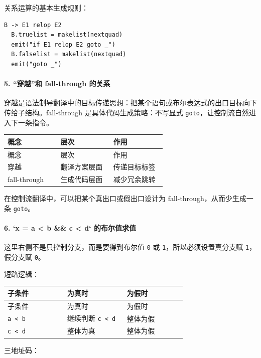 \documentclass[UTF8]{ctexart}
\begin{document}
关系运算的基本生成规则：

\begin{Verbatim}[fontsize=\small,breaklines=true]
B -> E1 relop E2
  B.truelist = makelist(nextquad)
  emit("if E1 relop E2 goto _")
  B.falselist = makelist(nextquad)
  emit("goto _")
\end{Verbatim}

\paragraph*{5. “穿越”和 fall-through 的关系}

穿越是语法制导翻译中的目标传递思想：把某个语句或布尔表达式的出口目标向下传给子结构。fall-through 是具体代码生成策略：不写显式 \texttt{goto}，让控制流自然进入下一条指令。

\begin{longtable}{|p{0.31\linewidth}|p{0.31\linewidth}|p{0.31\linewidth}|}
\hline
概念 & 层次 & 作用 \\
\hline
\endfirsthead
概念 & 层次 & 作用 \\
\hline
\endhead
穿越 & 翻译方案层面 & 传递目标标签 \\
\hline
fall-through & 生成代码层面 & 减少冗余跳转 \\
\hline
\end{longtable}

在控制流翻译中，可以把某个真出口或假出口设计为 fall-through，从而少生成一条 \texttt{goto}。

\paragraph*{6. `x = a < b \&\& c < d` 的布尔值求值}

这里右侧不是只控制分支，而是要得到布尔值 \texttt{0} 或 \texttt{1}，所以必须设置真分支赋 \texttt{1}，假分支赋 \texttt{0}。

短路逻辑：

\begin{longtable}{|p{0.31\linewidth}|p{0.31\linewidth}|p{0.31\linewidth}|}
\hline
子条件 & 为真时 & 为假时 \\
\hline
\endfirsthead
子条件 & 为真时 & 为假时 \\
\hline
\endhead
\texttt{a < b} & 继续判断 \texttt{c < d} & 整体为假 \\
\hline
\texttt{c < d} & 整体为真 & 整体为假 \\
\hline
\end{longtable}

三地址码：
\end{document}
